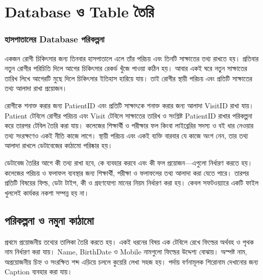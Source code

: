 \section{Database ও Table তৈরি}

\subsubsection{হাসপাতালের Database পরিকল্পনা}
একজন রোগী চিকিৎসার জন্য তিনবার হাসপাতালে এলে তাঁর পরিচয় এবং তিনটি সাক্ষাতের তথ্য রাখতে হয়। প্রতিবার নতুন রোগীর পরিচিতি দিলে আগের চিকিৎসার রেকর্ড খুঁজে পাওয়া কঠিন হয়। আবার একই ঘরে নতুন সাক্ষাতের তারিখ লিখে আগেরটি মুছে দিলে চিকিৎসার ইতিহাস হারিয়ে যায়। তাই রোগীর স্থায়ী পরিচয় এবং প্রতিটি সাক্ষাতের তথ্য আলাদা রাখা প্রয়োজন।

রোগীকে শনাক্ত করার জন্য PatientID এবং প্রতিটি সাক্ষাৎকে শনাক্ত করার জন্য আলাদা VisitID রাখা যায়।
Patient টেবিলে রোগীর পরিচয় এবং Visit টেবিলে সাক্ষাতের তারিখ ও সংশ্লিষ্ট PatientID রাখার পরিকল্পনা করে
তারপর টেবিল তৈরি করা যায়। কলেজের শিক্ষার্থী ও পরীক্ষার ফল কিংবা লাইব্রেরির সদস্য ও বই ধার নেওয়ার
তথ্য সংরক্ষণেও একই নীতি কাজে লাগে। স্থায়ী পরিচয় এবং একই ব্যক্তি বারবার যে কাজে অংশ নেন,
তার তথ্য আলাদা রাখলে ডেটাবেজের কাঠামো পরিষ্কার হয়।

ডেটাবেজ তৈরির আগে কী তথ্য রাখা হবে, কে ব্যবহার করবে এবং কী ফল প্রয়োজন---এগুলো নির্ধারণ করতে হয়। কলেজের পরিচয় ও ফলাফল ব্যবস্থার জন্য শিক্ষার্থী, পরীক্ষা ও ফলাফলের তথ্য আলাদা করা যেতে পারে। তারপর প্রতিটি বিষয়ের ফিল্ড, ডেটা টাইপ, কী ও গ্রহণযোগ্য মানের নিয়ম নির্ধারণ করা হয়। কেবল সফটওয়্যারে একটি ফাইল খুললেই কার্যকর নকশা সম্পন্ন হয় না।

\subsection{পরিকল্পনা ও নমুনা কাঠামো}
প্রথমে প্রয়োজনীয় তথ্যের তালিকা তৈরি করতে হয়। একই ধরনের বিষয় এক টেবিলে রেখে ফিল্ডের অর্থবহ ও পৃথক নাম নির্ধারণ করা যায়। Name, BirthDate ও Mobile নামগুলো ফিল্ডের উদ্দেশ্য বোঝায়। অস্পষ্ট নাম, অপ্রয়োজনীয় চিহ্ন ও সংরক্ষিত শব্দ এড়িয়ে চললে কুয়েরি লেখা সহজ হয়। পর্দায় বর্ণনামূলক শিরোনাম দেখানোর জন্য Caption ব্যবহার করা যায়।

